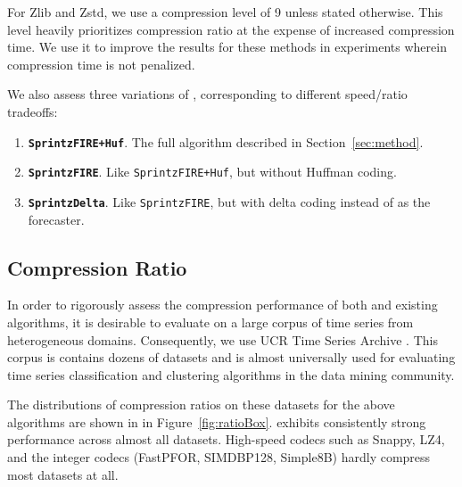 For Zlib and Zstd, we use a compression level of 9 unless stated otherwise. This level heavily prioritizes compression ratio at the expense of increased compression time. We use it to improve the results for these methods in experiments wherein compression time is not penalized.

We also assess three variations of \mine, corresponding to different speed/ratio tradeoffs:%
\begin{enumerate}
    \item \textbf{\texttt{SprintzFIRE+Huf}}. The full algorithm described in Section~\ref{sec:method}.
    \item \textbf{\texttt{SprintzFIRE}}. Like \texttt{SprintzFIRE+Huf}, but without Huffman coding.
    \item \textbf{\texttt{SprintzDelta}}. Like \texttt{SprintzFIRE}, but with delta coding instead of \fire as the forecaster.
\end{enumerate}



\subsection{Compression Ratio}

In order to rigorously assess the compression performance of both \minesp and existing algorithms, it is desirable to evaluate on a large corpus of time series from heterogeneous domains. Consequently, we use UCR Time Series Archive \cite{ucrTimeSeries}. This corpus is contains dozens of datasets and is almost universally used for evaluating time series classification and clustering algorithms in the data mining community.

The distributions of compression ratios on these datasets for the above algorithms are shown in in Figure~\ref{fig:ratioBox}. \mine \text{} exhibits consistently strong performance across almost all datasets. High-speed codecs such as Snappy, LZ4, and the integer codecs (FastPFOR, SIMDBP128, Simple8B) hardly compress most datasets at all.

